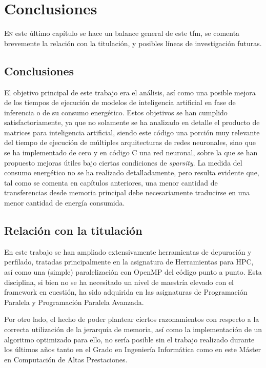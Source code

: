 \chapter{Conclusiones}
\label{chap:conclusiones}

\lettrine{E}{n} este último capítulo se hace un balance general de este \acrlong{tfm}, se comenta brevemente la relación con la titulación, y posibles líneas de investigación futuras.

\section{Conclusiones}
El objetivo principal de este trabajo era el análisis, así como una posible mejora de los tiempos de ejecución de modelos de inteligencia artificial en fase de inferencia o de su consumo energético. Estos objetivos se han cumplido satisfactoriamente, ya que no solamente se ha analizado en detalle el producto de matrices para inteligencia artificial, siendo este código una porción muy relevante del tiempo de ejecución de múltiples arquitecturas de redes neuronales, sino que se ha implementado de cero y en código C una red neuronal, sobre la que se han propuesto mejoras útiles bajo ciertas condiciones de \textit{sparsity}. La medida del consumo energético no se ha realizado detalladamente, pero resulta evidente que, tal como se comenta en capítulos anteriores, una menor cantidad de transferencias desde memoria principal debe necesariamente traducirse en una menor cantidad de energía consumida.

\section{Relación con la titulación}
En este trabajo se han ampliado extensivamente herramientas de depuración y perfilado, tratadas principalmente en la asignatura de Herramientas para HPC, así como una (simple) paralelización con OpenMP del código punto a punto. Esta disciplina, si bien no se ha necesitado un nivel de maestría elevado con el framework en cuestión, ha sido adquirida en las asignaturas de Programación Paralela y Programación Paralela Avanzada.

Por otro lado, el hecho de poder plantear ciertos razonamientos con respecto a la correcta utilización de la jerarquía de memoria, así como la implementación de un algoritmo optimizado para ello, no sería posible sin el trabajo realizado durante los últimos años tanto en el Grado en Ingeniería Informática como en este Máster en Computación de Altas Prestaciones.

